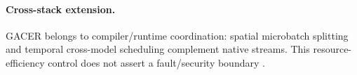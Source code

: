 \paragraph{Cross-stack extension.} GACER belongs to compiler/runtime coordination: spatial microbatch splitting and temporal cross-model scheduling complement native streams. This resource-efficiency control does not assert a fault/security boundary \cite{s027}.
